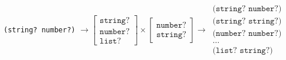 \texttt{(string? number?)} $\rightarrow \begin{bmatrix}
  \texttt{string?} \\
  \texttt{number?} \\
  \texttt{list?}
\end{bmatrix} \times \begin{bmatrix}
  \texttt{number?} \\
  \texttt{string?}
\end{bmatrix} \rightarrow \, \begin{matrix}
  \texttt{(string? number?)} \\
  \texttt{(string? string?)} \\
  \texttt{(number? number?)} \\
  \dotsc \\
  \texttt{(list? string?)}
\end{matrix}$
